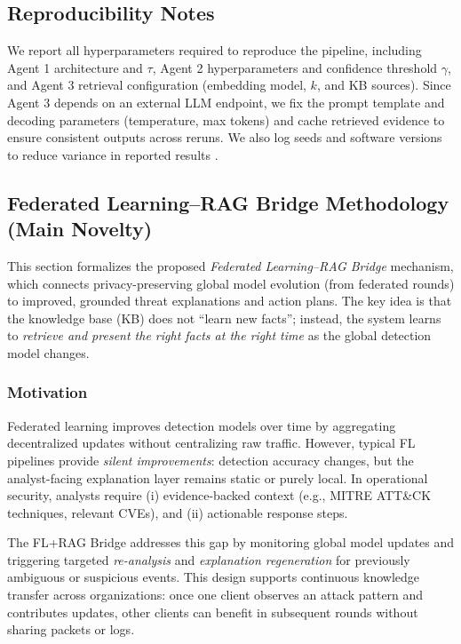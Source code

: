 \documentclass[conference]{IEEEtran}
\begin{document}
\subsection{Reproducibility Notes}
\label{sec:reproducibility_notes}

We report all hyperparameters required to reproduce the pipeline, including Agent 1 architecture and $\tau$, Agent 2 hyperparameters and confidence threshold $\gamma$, and Agent 3 retrieval configuration (embedding model, $k$, and KB sources). Since Agent 3 depends on an external LLM endpoint, we fix the prompt template and decoding parameters (temperature, max tokens) and cache retrieved evidence to ensure consistent outputs across reruns. We also log seeds and software versions to reduce variance in reported results \cite{Dodge2019Reporting}.

\subsection{Federated Learning--RAG Bridge Methodology (Main Novelty)}
\label{sec:fl-rag-bridge-methods}

This section formalizes the proposed \emph{Federated Learning--RAG Bridge} mechanism, which connects privacy-preserving global model evolution (from federated rounds) to improved, grounded threat explanations and action plans. The key idea is that the knowledge base (KB) does not ``learn new facts''; instead, the system learns to \emph{retrieve and present the right facts at the right time} as the global detection model changes.

\subsubsection{Motivation}
Federated learning improves detection models over time by aggregating decentralized updates without centralizing raw traffic. However, typical FL pipelines provide \emph{silent improvements}: detection accuracy changes, but the analyst-facing explanation layer remains static or purely local. In operational security, analysts require (i) evidence-backed context (e.g., MITRE ATT\&CK techniques, relevant CVEs), and (ii) actionable response steps.

The FL+RAG Bridge addresses this gap by monitoring global model updates and triggering targeted \emph{re-analysis} and \emph{explanation regeneration} for previously ambiguous or suspicious events. This design supports continuous knowledge transfer across organizations: once one client observes an attack pattern and contributes updates, other clients can benefit in subsequent rounds without sharing packets or logs.
\end{document}
